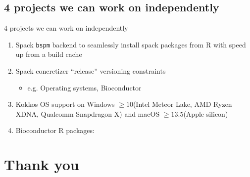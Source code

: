 \documentclass[
aspectratio=169,
xcolor={usenames}
]{beamer}
\begin{document}
\subsection{4 projects we can work on independently}
\begin{frame}{4 projects we can work on independently}
  \begin{enumerate}[<+->]
  \item Spack \texttt{bspm} backend to seamlessly install spack packages from R
    with speed up from a build cache
  \item Spack concretizer ``release'' versioning constraints
    \begin{itemize}[<.->]
    \item e.g. Operating systems, Bioconductor
    \end{itemize}
  \item Kokkos OS support on %
    Windows $\ge 10$\footnotemark[1]
    (Intel Meteor Lake, AMD Ryzen XDNA, Qualcomm Snapdragon X) and %
    macOS $\ge 13.5$\footnotemark[2]
    (Apple silicon)
  \item Bioconductor R packages\footnotemark[3]:
  \end{enumerate}
\end{frame}

\section{Thank you}
\end{document}
